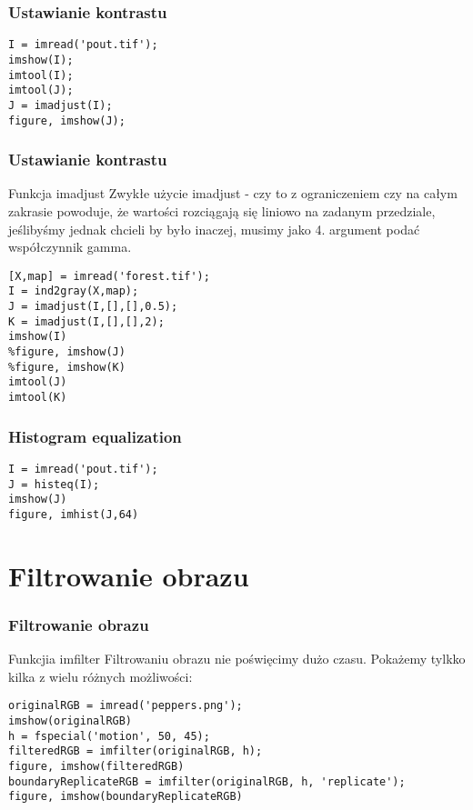 \documentclass{beamer}
\begin{document}
\begin{frame}[fragile]
\frametitle{Ustawianie kontrastu}
\begin{example}
\begin{lstlisting}
I = imread('pout.tif');
imshow(I);
imtool(I);
imtool(J);
J = imadjust(I);
figure, imshow(J);
\end{lstlisting}
\end{example}
\end{frame}

\begin{frame}[fragile]
\frametitle{Ustawianie kontrastu}
\begin{block}{Funkcja imadjust}
Zwykłe użycie imadjust - czy to z ograniczeniem czy na całym zakrasie powoduje, że wartości rozciągają się liniowo na zadanym przedziale, jeślibyśmy jednak chcieli by było inaczej, musimy jako 4. argument podać współczynnik gamma.
\end{block}
\begin{example}
\begin{lstlisting}
[X,map] = imread('forest.tif');
I = ind2gray(X,map);
J = imadjust(I,[],[],0.5);
K = imadjust(I,[],[],2);
imshow(I)
%figure, imshow(J)
%figure, imshow(K)
imtool(J)
imtool(K)
\end{lstlisting}
\end{example}
\end{frame}

\begin{frame}[fragile]
\frametitle{Histogram equalization}
\begin{example}
\begin{lstlisting}
I = imread('pout.tif');
J = histeq(I);
imshow(J)
figure, imhist(J,64)
\end{lstlisting}
\end{example}
\end{frame}

\section{Filtrowanie obrazu}

\begin{frame}[fragile]
\frametitle{Filtrowanie obrazu}
\begin{block}{Funkcjia imfilter}
Filtrowaniu obrazu nie poświęcimy dużo czasu. Pokażemy tylkko kilka z wielu różnych możliwości:
\end{block}

\begin{example}
\begin{lstlisting}
originalRGB = imread('peppers.png');
imshow(originalRGB)
h = fspecial('motion', 50, 45);
filteredRGB = imfilter(originalRGB, h);
figure, imshow(filteredRGB)
boundaryReplicateRGB = imfilter(originalRGB, h, 'replicate');
figure, imshow(boundaryReplicateRGB)
\end{lstlisting}
\end{example}

\end{frame}
\end{document}
